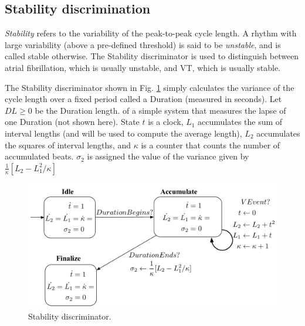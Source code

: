 \subsection{Stability discrimination}
\label{sec:stability}
\emph{Stability} refers to the variability of the peak-to-peak cycle length.
A rhythm with large variability (above a pre-defined threshold) is said to be \emph{unstable}, and is called stable otherwise.
The Stability discriminator is used to distinguish between atrial fibrillation, which is usually unstable, and \ac{VT}, which is usually stable.

The Stability discriminator shown in Fig. \ref{fig:Hstab} simply calculates the variance of the cycle length over a fixed period called a Duration (measured in seconds).
Let $DL \geq 0$ be the Duration length.
 of a simple system that measures the lapse of one Duration (not shown here).
State $t$ is a clock, $L_1$ accumulates the sum of interval lengths (and will be used to compute the average length), 
$L_2$ accumulates the squares of interval lengths,
and $\kappa$ is a counter that counts the number of accumulated beats.
$\sigma_2$ is assigned the value of the variance given by $\frac{1}{\kappa}[L_2 - L_1^2/\kappa]$
\begin{figure}[t]
	\centering
	\includegraphics[scale=0.3]{figures/stability1v2}
	\vspace{-10pt}
	\caption{Stability discriminator.}
	\vspace{-10pt}
	\label{fig:Hstab}
\end{figure}

